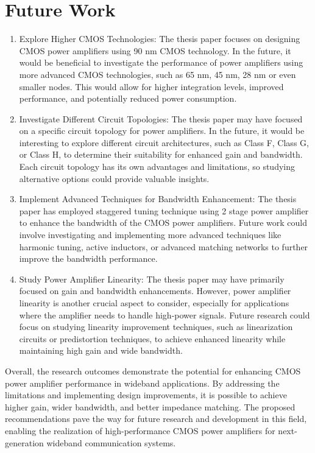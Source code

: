 \section{Future Work}
\begin{enumerate}
    

\item Explore Higher CMOS Technologies:
 The thesis paper focuses on designing CMOS power amplifiers using 90 nm CMOS technology. In the future, it would be beneficial to investigate the performance of power amplifiers using more advanced CMOS technologies, such as 65 nm, 45 nm, 28 nm or even smaller nodes. This would allow for higher integration levels, improved performance, and potentially reduced power consumption.

\item Investigate Different Circuit Topologies:
 The thesis paper may have focused on a specific circuit topology for power amplifiers. In the future, it would be interesting to explore different circuit architectures, such as Class F, Class G, or Class H, to determine their suitability for enhanced gain and bandwidth. Each circuit topology has its own advantages and limitations, so studying alternative options could provide valuable insights.

\item Implement Advanced Techniques for Bandwidth Enhancement:
 The thesis paper has employed staggered tuning technique using 2 stage power amplifier to enhance the bandwidth of the CMOS power amplifiers. Future work could involve investigating and implementing more advanced techniques like harmonic tuning, active inductors, or advanced matching networks to further improve the bandwidth performance.

\item Study Power Amplifier Linearity: 
The thesis paper may have primarily focused on gain and bandwidth enhancements. However, power amplifier linearity is another crucial aspect to consider, especially for applications where the amplifier needs to handle high-power signals. Future research could focus on studying linearity improvement techniques, such as linearization circuits or predistortion techniques, to achieve enhanced linearity while maintaining high gain and wide bandwidth.
\end{enumerate}
Overall, the research outcomes demonstrate the potential for enhancing CMOS power amplifier performance in wideband applications. By addressing the limitations and implementing design improvements, it is possible to achieve higher gain, wider bandwidth, and better impedance matching. The proposed recommendations pave the way for future research and development in this field, enabling the realization of high-performance CMOS power amplifiers for next-generation wideband communication systems.
